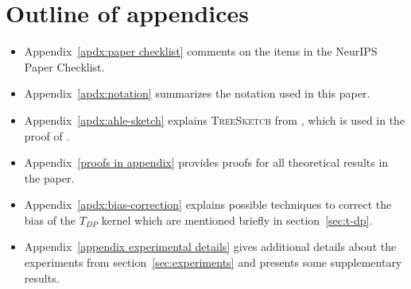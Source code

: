 \documentclass{article}
\begin{document}





\appendix
{}  %

\clearpage
\section*{Outline of appendices}

\begin{itemize}
    \item Appendix~\ref{apdx:paper checklist} comments on the items in the NeurIPS Paper Checklist.
    \item Appendix~\ref{apdx:notation} summarizes the notation used in this paper.
    \item Appendix~\ref{apdx:ahle-sketch} explains \textsc{TreeSketch} from \citet{ahle2020oblivious},
        which is used in the proof of .
    \item Appendix~\ref{proofs in appendix} provides proofs for all theoretical results in the paper.
    \item Appendix~\ref{apdx:bias-correction} explains possible techniques to correct the bias of the $T_{DP}$ kernel
        which are mentioned briefly in section~\ref{sec:t-dp}.
    \item Appendix~\ref{appendix experimental details} gives additional details about the experiments from section~\ref{sec:experiments} and presents some supplementary results.
\end{itemize}

\clearpage

\clearpage

\clearpage

\clearpage

\clearpage

\clearpage

\end{document}
